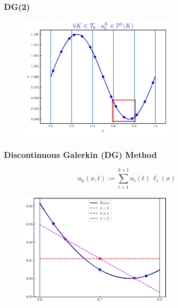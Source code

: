 \documentclass{beamer}
\begin{document}
\begin{frame}
\frametitle{DG(2)}

  \begin{figure}[htb!]
    \centering
    \includegraphics[width=0.7\textwidth]{fig.sine_k2_box.png}
  \end{figure}

\end{frame}

\begin{frame}
\frametitle{Discontinuous Galerkin (DG) Method}

  \Fontvi

  \begin{equation*}
    u_{h}\left(x,t\right)
    :=\sum\limits_{i=1}^{k+1}
      u_{i}\left(t\right)\,\ell_{i}\left(x\right)
  \end{equation*}

  \begin{figure}[htb!]
    \centering
    \includegraphics[width=0.7\textwidth]{fig.DG_1D.png}
  \end{figure}

\end{frame}
\end{document}
